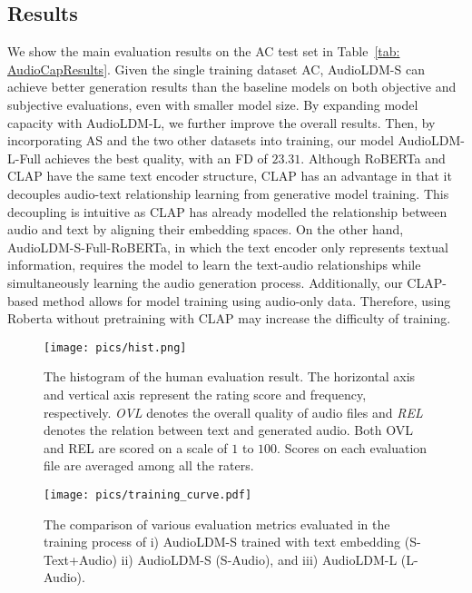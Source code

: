 \documentclass{article}
\begin{document}
\subsection{Results}

We show the main evaluation results on the AC test set in Table~\ref{tab: AudioCapResults}. Given the single training dataset AC, AudioLDM-S can achieve better generation results than the baseline models on both objective and subjective evaluations, even with smaller model size. By expanding model capacity with AudioLDM-L, we further improve the overall results. Then, by incorporating AS and the two other datasets into training, our model AudioLDM-L-Full achieves the best quality, with an FD of $23.31$. 
Although RoBERTa and CLAP have the same text encoder structure, CLAP has an advantage in that it decouples audio-text relationship learning from generative model training. This decoupling is intuitive as CLAP has already modelled the relationship between audio and text by aligning their embedding spaces. On the other hand, AudioLDM-S-Full-RoBERTa, in which the text encoder only represents textual information, requires the model to learn the text-audio relationships while simultaneously learning the audio generation process. Additionally, our CLAP-based method allows for model training using audio-only data. Therefore, using Roberta without pretraining with CLAP may increase the difficulty of training.

\begin{figure*}[tbp]
    \centering
    \texttt{[image: pics/hist.png]}
\caption{The histogram of the human evaluation result. The horizontal axis and vertical axis represent the rating score and frequency, respectively. \textit{OVL} denotes the overall quality of audio files and \textit{REL} denotes the relation between text and generated audio. Both OVL and REL are scored on a scale of $1$ to $100$. Scores on each evaluation file are averaged among all the raters.}
    \label{fig:hist-human-evaluation}
\end{figure*}

\begin{figure}[tbp]
    \centering
    \texttt{[image: pics/training\_curve.pdf]}
    \caption{The comparison of various evaluation metrics evaluated in the training process of i) AudioLDM-S trained with text embedding (S-Text+Audio) ii) AudioLDM-S (S-Audio), and iii) AudioLDM-L (L-Audio).}
    \label{fig:training-steps-fd-is-kl}
\end{figure}
\end{document}
